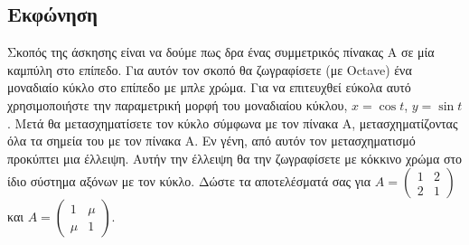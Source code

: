 \documentclass[a4paper,12pt]{article}
\begin{document}
\subsection{Εκφώνηση}
Σκοπός της άσκησης είναι να δούμε πως δρα ένας συμμετρικός πίνακας Α σε μία
καμπύλη στο επίπεδο. Για αυτόν τον σκοπό θα ζωγραφίσετε (με Octave) ένα
μοναδιαίο κύκλο στο επίπεδο με μπλε χρώμα. Για να επιτευχθεί εύκολα αυτό
χρησιμοποιήστε την παραμετρική μορφή του μοναδιαίου κύκλου, $x=\cos{t}$,
$y=\sin{t}$. Μετά θα μετασχηματίσετε τον κύκλο σύμφωνα με τον πίνακα Α,
μετασχηματίζοντας όλα τα σημεία του με τον πίνακα Α. Εν γένη, από αυτόν
τον μετασχηματισμό προκύπτει μια έλλειψη. Αυτήν την έλλειψη θα την ζωγραφίσετε
με κόκκινο χρώμα στο ίδιο σύστημα αξόνων με τον κύκλο. Δώστε τα αποτελέσματά
σας για $
	A=\begin{pmatrix}
		1 & 2 \\
		2 & 1
	\end{pmatrix}
$ και $
	A=\begin{pmatrix}
		1   & \mu \\
		\mu & 1
	\end{pmatrix}
$.
\end{document}
